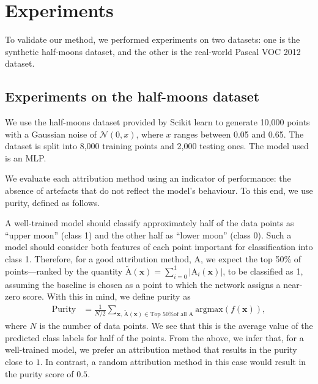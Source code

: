 \section{Experiments}
\label{sec:experiments}

To validate our method, we performed experiments on two datasets: one is the synthetic half-moons dataset, and the other is the real-world Pascal VOC 2012 dataset.

\subsection{Experiments on the half-moons dataset}
\label{subsec:half-moons}

We use the half-moons dataset provided by Scikit learn \citep{scikit-learn} to generate 10,000 points with a Gaussian noise of $\mathcal{N}(0, x)$, where $x$ ranges between 0.05 and 0.65. The dataset is split into 8,000 training points and 2,000 testing ones. The model used is an MLP.

We evaluate each attribution method using an indicator of performance: the absence of artefacts that do not reflect the model's behaviour. To this end, we use purity, defined as follows.

A well-trained model should classify approximately half of the data points as ``upper moon'' (class 1) and the other half as ``lower moon'' (class 0). Such a model should consider both features of each point important for classification into class 1. Therefore, for a good attribution method, $\text{A}$, we expect the top 50\% of points—ranked by the quantity $\widetilde{\text{A}}(\textbf{x}) = \sum_{i=0}^1 |\text{A}_i(\textbf{x})|$, to be classified as 1, assuming the baseline is chosen as a point to which the network assigns a near-zero score. With this in mind, we define purity as
\begin{equation}
\begin{split}
    \textrm{Purity} &= \frac{1}{N/2}\sum_{\textbf{x}, \, \widetilde{\text{A}}(\textbf{x}) \in \textrm{Top 50\% of all A}} \textrm{argmax}(f(\textbf{x})),
\end{split}
\label{eq:moons-purity}
\end{equation}
where $N$ is the number of data points. We see that this is the average value of the predicted class labels for half of the points. From the above, we infer that, for a well-trained model, we prefer an attribution method that results in the purity close to $1$. In contrast, a random attribution method in this case would result in the purity score of $0.5$. 

